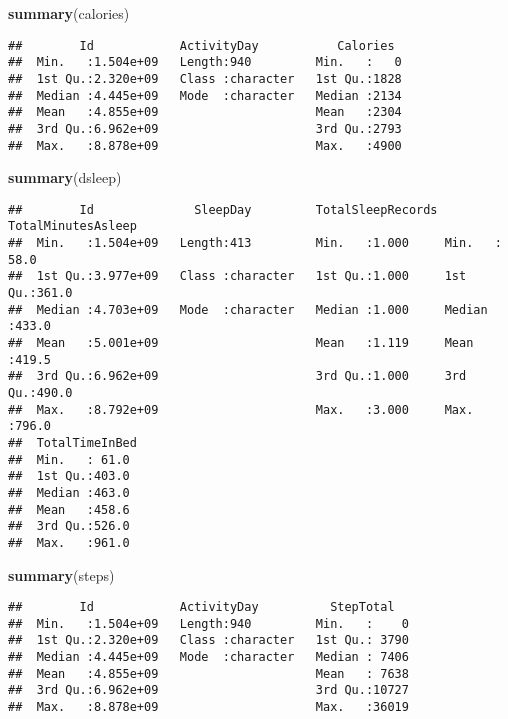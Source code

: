 \documentclass[
]{article}
\newenvironment{Shaded}{\begin{snugshade}}{\end{snugshade}}
\newcommand{\FunctionTok}[1]{\textcolor[rgb]{0.13,0.29,0.53}{\textbf{#1}}}
\newcommand{\NormalTok}[1]{#1}
\begin{document}
\begin{Shaded}
\begin{Highlighting}[]
\FunctionTok{summary}\NormalTok{(calories)}
\end{Highlighting}
\end{Shaded}

\begin{verbatim}
##        Id            ActivityDay           Calories   
##  Min.   :1.504e+09   Length:940         Min.   :   0  
##  1st Qu.:2.320e+09   Class :character   1st Qu.:1828  
##  Median :4.445e+09   Mode  :character   Median :2134  
##  Mean   :4.855e+09                      Mean   :2304  
##  3rd Qu.:6.962e+09                      3rd Qu.:2793  
##  Max.   :8.878e+09                      Max.   :4900
\end{verbatim}

\begin{Shaded}
\begin{Highlighting}[]
\FunctionTok{summary}\NormalTok{(dsleep)}
\end{Highlighting}
\end{Shaded}

\begin{verbatim}
##        Id              SleepDay         TotalSleepRecords TotalMinutesAsleep
##  Min.   :1.504e+09   Length:413         Min.   :1.000     Min.   : 58.0     
##  1st Qu.:3.977e+09   Class :character   1st Qu.:1.000     1st Qu.:361.0     
##  Median :4.703e+09   Mode  :character   Median :1.000     Median :433.0     
##  Mean   :5.001e+09                      Mean   :1.119     Mean   :419.5     
##  3rd Qu.:6.962e+09                      3rd Qu.:1.000     3rd Qu.:490.0     
##  Max.   :8.792e+09                      Max.   :3.000     Max.   :796.0     
##  TotalTimeInBed 
##  Min.   : 61.0  
##  1st Qu.:403.0  
##  Median :463.0  
##  Mean   :458.6  
##  3rd Qu.:526.0  
##  Max.   :961.0
\end{verbatim}

\begin{Shaded}
\begin{Highlighting}[]
\FunctionTok{summary}\NormalTok{(steps)}
\end{Highlighting}
\end{Shaded}

\begin{verbatim}
##        Id            ActivityDay          StepTotal    
##  Min.   :1.504e+09   Length:940         Min.   :    0  
##  1st Qu.:2.320e+09   Class :character   1st Qu.: 3790  
##  Median :4.445e+09   Mode  :character   Median : 7406  
##  Mean   :4.855e+09                      Mean   : 7638  
##  3rd Qu.:6.962e+09                      3rd Qu.:10727  
##  Max.   :8.878e+09                      Max.   :36019
\end{verbatim}
\end{document}
